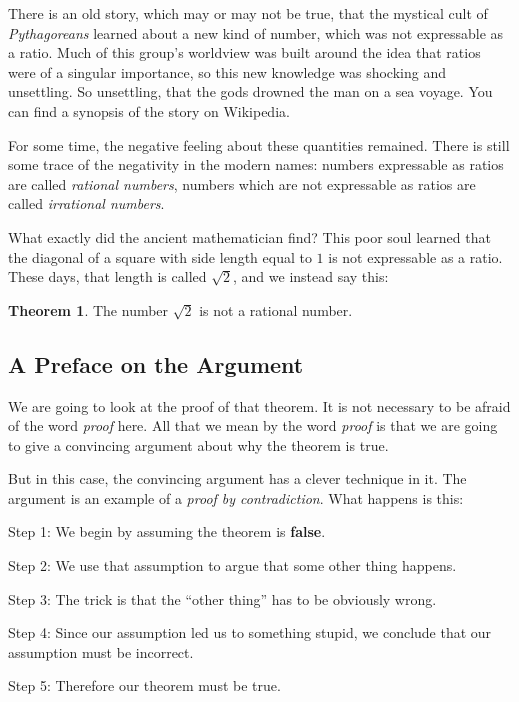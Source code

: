 \documentclass[12pt,letterpaper]{article}
\theoremstyle{definition}
\newtheorem{theorem}{Theorem}
\begin{document}
There is an old story, which may or may not be true, that the mystical cult of \emph{Pythagoreans} learned about a new kind of number, which was not expressable as a ratio. 
Much of this group's worldview was built around the idea that ratios were of a singular importance, so this new knowledge was shocking and unsettling.
So unsettling, that the gods drowned the man on a sea voyage. 
You can find a synopsis of the story on Wikipedia\cite{wikipedia}.

For some time, the negative feeling about these quantities remained.
There is still some trace of the negativity in the modern names:
numbers expressable as ratios are called \emph{rational numbers}, numbers which are not expressable as ratios are called \emph{irrational numbers}.

What exactly did the ancient mathematician find?
This poor soul learned that the diagonal of a square with side length equal to $1$ is not expressable as a ratio.
These days, that length is called $\sqrt{2}$, and we instead say this:

\begin{theorem}
The number $\sqrt{2}$ is not a rational number.
\end{theorem}

\subsection*{A Preface on the Argument}

We are going to look at the proof of that theorem.
It is not necessary to be afraid of the word \emph{proof} here.
All that we mean by the word \emph{proof} is that we are going to give a convincing argument about why the theorem is true.

But in this case, the convincing argument has a clever technique in it.
The argument is an example of a \emph{proof by contradiction}. 
What happens is this:
\begin{compactdesc}
\item[Step 1:] We begin by assuming the theorem is \textbf{false}.
\item[Step 2:] We use that assumption to argue that some other thing happens.
\item[Step 3:] The trick is that the ``other thing'' has to be obviously wrong.
\item[Step 4:] Since our assumption led us to something stupid, we conclude that our assumption must be incorrect.
\item[Step 5:] Therefore our theorem must be true.
\end{compactdesc}
\end{document}
